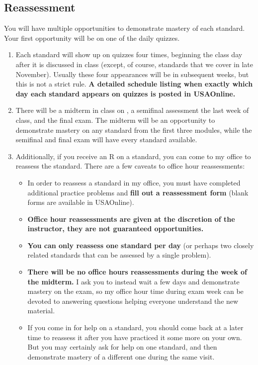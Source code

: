 {    \subsection*{\fontsize{10}{12}\selectfont Reassessment}
    You will have multiple opportunities to demonstrate mastery of each standard.  Your first opportunity will be on one of the daily quizzes.
    \begin{enumerate}[1)]
    \item Each standard will show up on quizzes four times, beginning the class day after it is discussed in class (except, of course, standards that we cover in late November).  Usually these four appearances will be in subsequent weeks, but this is not a strict rule.  {\bf A detailed schedule listing when exactly which day each standard appears on quizzes is posted in USAOnline.}
    \item There will be a midterm in class on , a semifinal assessment the last week of class, and the final exam.  The midterm will be an opportunity to demonstrate mastery on any standard from the first three modules, while the semifinal and final exam will have every standard available.
    \item Additionally, if you receive an R on a standard, you can come to my office to reassess the standard.  There are a few caveats to office hour reassessments:
    \begin{itemize}
    \item In order to reassess a standard in my office, you must have completed additional practice problems and {\bf fill out a reassessment form} (blank forms are available in USAOnline).
    \item \textbf{Office hour reassessments are given at the discretion of the instructor, they are not guaranteed opportunities. }
    \item \textbf{You can only reassess one standard per day} (or perhaps two closely related standards that can be assessed by a single problem).
    \item \textbf{There will be no office hours reassessments during the week of the midterm.}  I ask you to instead wait a few days and demonstrate mastery on the exam, so my office hour time during exam week can be devoted to answering questions helping everyone understand the new material.
    \item If you come in for help on a standard, you should come back at a later time to reassess it after you have practiced it some more on your own.  But you may certainly ask for help on one standard, and then demonstrate mastery of a different one during the same visit.

\end{itemize}
\end{enumerate}}
